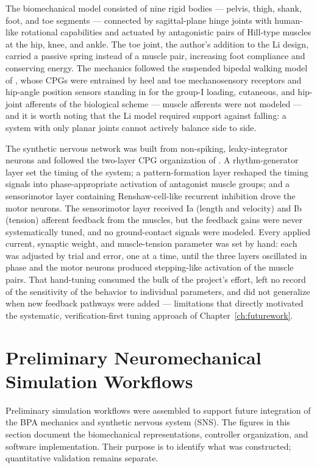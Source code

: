 The biomechanical model consisted of nine rigid bodies --- pelvis, thigh, shank, foot, and toe segments --- connected by sagittal-plane hinge joints with human-like rotational capabilities and actuated by antagonistic pairs of Hill-type muscles at the hip, knee, and ankle. The toe joint, the author's addition to the Li design, carried a passive spring instead of a muscle pair, increasing foot compliance and conserving energy. The mechanics followed the suspended bipedal walking model of \citet{li_bipedal_2017}, whose CPGs were entrained by heel and toe mechanosensory receptors and hip-angle position sensors standing in for the group-I loading, cutaneous, and hip-joint afferents of the biological scheme --- muscle afferents were not modeled --- and it is worth noting that the Li model required support against falling: a system with only planar joints cannot actively balance side to side.

The synthetic nervous network was built from non-spiking, leaky-integrator neurons and followed the two-layer CPG organization of \citet{deng_neuromechanical_2019}. A rhythm-generator layer set the timing of the system; a pattern-formation layer reshaped the timing signals into phase-appropriate activation of antagonist muscle groups; and a sensorimotor layer containing Renshaw-cell-like recurrent inhibition drove the motor neurons. The sensorimotor layer received Ia (length and velocity) and Ib (tension) afferent feedback from the muscles, but the feedback gains were never systematically tuned, and no ground-contact signals were modeled. Every applied current, synaptic weight, and muscle-tension parameter was set by hand: each was adjusted by trial and error, one at a time, until the three layers oscillated in phase and the motor neurons produced stepping-like activation of the muscle pairs. That hand-tuning consumed the bulk of the project's effort, left no record of the sensitivity of the behavior to individual parameters, and did not generalize when new feedback pathways were added --- limitations that directly motivated the systematic, verification-first tuning approach of Chapter~\ref{ch:futurework}.

\section{Preliminary Neuromechanical Simulation Workflows}\label{sec:preliminary_sim_methods}

Preliminary simulation workflows were assembled to support future integration of the BPA mechanics and synthetic nervous system (SNS). The figures in this section document the biomechanical representations, controller organization, and software implementation. Their purpose is to identify what was constructed; quantitative validation remains separate.

